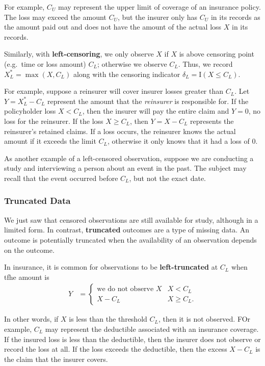 \documentclass[]{book}
\theoremstyle{definition}
\theoremstyle{definition}
\theoremstyle{definition}
\theoremstyle{remark}
\begin{document}
For example, \(C_U\) may represent the upper limit of coverage of an
insurance policy. The loss may exceed the amount \(C_U\), but the
insurer only has \(C_U\) in its records as the amount paid out and does
not have the amount of the actual loss \(X\) in its records.

Similarly, with \textbf{left-censoring}, we only observe \(X\) if \(X\)
is above censoring point (e.g.~time or loss amount) \(C_L\); otherwise
we observe \(C_L\). Thus, we record \(X_L^{\ast}= \max(X, C_L)\) along
with the censoring indicator \(\delta_L= \mathrm{I}(X \leq C_L)\).

For example, suppose a reinsurer will cover insurer losses greater than
\(C_L\). Let \(Y = X_L^{\ast} - C_L\) represent the amount that the
\emph{reinsurer} is responsible for. If the policyholder loss
\(X < C_L\), then the insurer will pay the entire claim and \(Y =0\), no
loss for the reinsurer. If the loss \(X \ge C_L\), then \(Y = X-C_L\)
represents the reinsurer's retained claims. If a loss occurs, the
reinsurer knows the actual amount if it exceeds the limit \(C_L\),
otherwise it only knows that it had a loss of \(0\).

As another example of a left-censored observation, suppose we are
conducting a study and interviewing a person about an event in the past.
The subject may recall that the event occurred before \(C_L\), but not
the exact date.

\subsubsection{Truncated Data}\label{truncated-data}

We just saw that censored observations are still available for study,
although in a limited form. In contrast, \textbf{truncated} outcomes are
a type of missing data. An outcome is potentially truncated when the
availability of an observation depends on the outcome.

In insurance, it is common for observations to be
\textbf{left-truncated} at \(C_L\) when tfhe amount is \[\begin{aligned}
Y &=
\left\{
\begin{array}{ll}
\text{we do not observe }X & X < C_L \\
X- C_L & X \geq C_L.
\end{array}
\right.\end{aligned}\]

In other words, if \(X\) is less than the threshold \(C_L\), then it is
not observed. FOr example, \(C_L\) may represent the deductible
associated with an insurance coverage. If the insured loss is less than
the deductible, then the insurer does not observe or record the loss at
all. If the loss exceeds the deductible, then the excess \(X-C_L\) is
the claim that the insurer covers.
\end{document}
